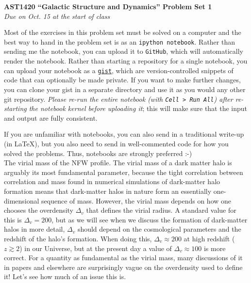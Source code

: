 \documentclass[12pt]{article}
\begin{document}
\begin{center}
{\bf \LARGE AST1420 ``Galactic Structure and Dynamics'' Problem Set 1}\\[7pt]
\emph{Due on Oct. 15 at the start of class}\\[7pt]
\end{center}

Most of the exercises in this problem set must be solved on a computer
and the best way to hand in the problem set is as an \texttt{ipython
  notebook}. Rather than sending me the notebook, you can upload it to
\texttt{GitHub}, which will automatically render the notebook. Rather
than starting a repository for a single notebook, you can upload your
notebook as a \texttt{\href{https://gist.github.com/}{gist}}, which
are version-controlled snippets of code that can optionally be made
private. If you want to make further changes, you can clone your gist
in a separate directory and use it as you would any other git
repository. \emph{Please re-run the entire notebook (with \texttt{Cell
    > Run All}) after re-starting the notebook kernel before uploading
  it}; this will make sure that the input and output are fully
consistent.

If you are unfamiliar with notebooks, you can also send in a
traditional write-up (in LaTeX), but you also need to send in
well-commented code for how you solved the problems. Thus, notebooks
are strongly preferred :-)\\

 The virial mass of the NFW profile. The
virial mass of a dark matter halo is arguably its most fundamental
parameter, because the tight correlation between correlation and mass
found in numerical simulations of dark-matter halo formation means
that dark-matter halos in nature form an essentially one-dimensional
sequence of mass. However, the virial mass depends on how one chooses
the overdensity $\Delta_v$ that defines the virial radius. A standard
value for this is $\Delta_v = 200$, but as we will see when we discuss
the formation of dark-matter halos in more detail, $\Delta_v$ should
depend on the cosmological parameters and the redshift of the halo's
formation. When doing this, $\Delta_v \approx 200$ at high redshift
($z \gtrsim 2$) in our Universe, but at the present day a value of
$\Delta_v \approx 100$ is more correct. For a quantity as fundamental
as the virial mass, many discussions of it in papers and elsewhere are
surprisingly vague on the overdensity used to define it! Let's see how
much of an issue this is.\\
\end{document}

